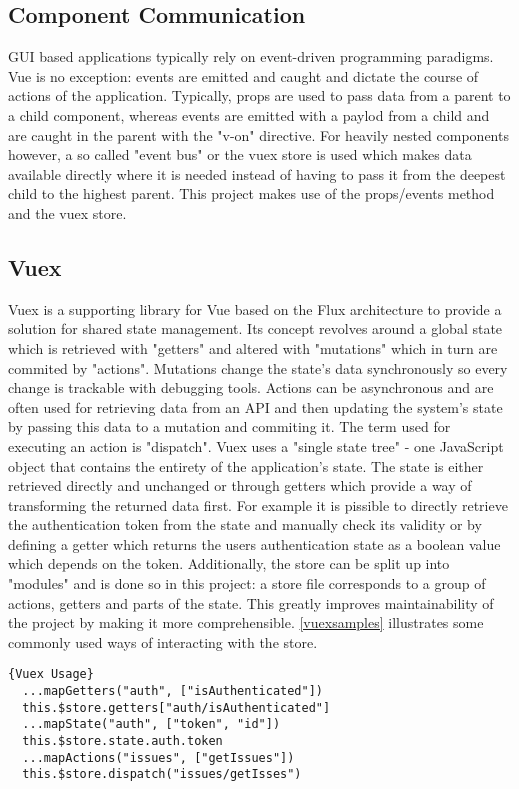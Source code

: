 \subsection{Component Communication}
GUI based applications typically rely on event-driven programming paradigms. Vue is no exception: events are emitted and caught and dictate the course of actions of the application. Typically, props are used to pass data from a parent to a child component, whereas events are emitted with a paylod from a child and are caught in the parent with the "v-on" directive. For heavily nested components however, a so called "event bus" or the vuex store is used which makes data available directly where it is needed instead of having to pass it from the deepest child to the highest parent. This project makes use of the props/events method and the vuex store.

\subsection{Vuex}
Vuex is a supporting library for Vue based on the Flux architecture to provide a solution for shared state management. Its concept revolves around a global state which is retrieved with "getters" and altered with "mutations" which in turn are commited by "actions". Mutations change the state's data synchronously so every change is trackable with debugging tools. Actions can be asynchronous and are often used for retrieving data from an API and then updating the system's state by passing this data to a mutation and commiting it. The term used for executing an action is "dispatch". Vuex uses a "single state tree" - one JavaScript object that contains the entirety of the application's state. The state is either retrieved directly and unchanged or through getters which provide a way of transforming the returned data first. For example it is pissible to directly retrieve the authentication token from the state and manually check its validity or by defining a getter which returns the users authentication state as a boolean value which depends on the token.
 Additionally, the store can be split up into "modules" and is done so in this project: a store file corresponds to a group of actions, getters and parts of the state. This greatly improves maintainability of the project by making it more comprehensible. \autoref{vuexsamples} illustrates some commonly used ways of interacting with the store. \newline

\begin{lstlisting}[caption=Vuex Usage, captionpos=b, style=htmlcssjs, label=vuexsamples]{Vuex Usage}
  ...mapGetters("auth", ["isAuthenticated"])
  this.$store.getters["auth/isAuthenticated"]
  ...mapState("auth", ["token", "id"])
  this.$store.state.auth.token
  ...mapActions("issues", ["getIssues"])
  this.$store.dispatch("issues/getIsses")
\end{lstlisting}


